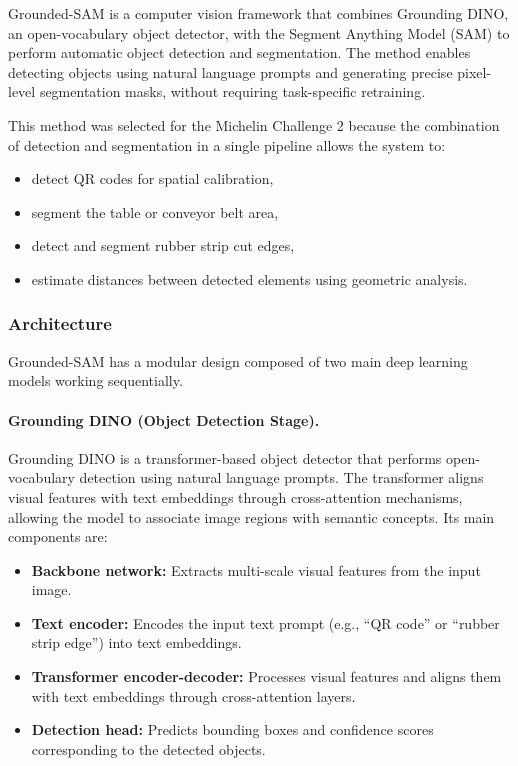 \documentclass[11pt]{article}
\begin{document}
Grounded-SAM \cite{RenGroundedSAM2024} is a computer vision framework that combines 
Grounding DINO, an open-vocabulary object detector, with the Segment Anything Model (SAM) 
to perform automatic object detection and segmentation. The method enables detecting objects 
using natural language prompts and generating precise pixel-level segmentation masks, without 
requiring task-specific retraining.

This method was selected for the Michelin Challenge 2 because the combination of detection 
and segmentation in a single pipeline allows the system to:
\begin{itemize}
    \item detect QR codes for spatial calibration,
    \item segment the table or conveyor belt area,
    \item detect and segment rubber strip cut edges,
    \item estimate distances between detected elements using geometric analysis.
\end{itemize}

\subsubsection{Architecture}

Grounded-SAM has a modular design composed of two main deep learning models working sequentially.

\paragraph{Grounding DINO (Object Detection Stage).}
Grounding DINO is a transformer-based object detector that performs open-vocabulary 
detection using natural language prompts. The transformer aligns visual features with text 
embeddings through cross-attention mechanisms, allowing the model to associate image 
regions with semantic concepts. Its main components are:

\begin{itemize}
    \item \textbf{Backbone network:} Extracts multi-scale visual features from the input image.
    \item \textbf{Text encoder:} Encodes the input text prompt (e.g., ``QR code'' or 
    ``rubber strip edge'') into text embeddings.
    \item \textbf{Transformer encoder-decoder:} Processes visual features and aligns them 
    with text embeddings through cross-attention layers.
    \item \textbf{Detection head:} Predicts bounding boxes and confidence scores 
    corresponding to the detected objects.
\end{itemize}
\end{document}
